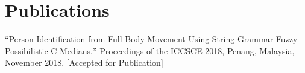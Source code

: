 \documentclass[]{deedy-resume-openfont}
\begin{document}
\begin{minipage}[t]{0.66\textwidth}

\section{Publications} 
“Person Identification from Full-Body Movement Using String Grammar Fuzzy-Possibilistic C-Medians,” Proceedings of the ICCSCE 2018, Penang, Malaysia, November 2018. [Accepted for Publication]
\sectionsep


% 
% 

\end{minipage} 
\end{document}
